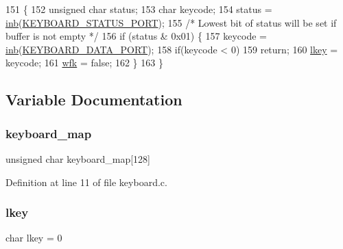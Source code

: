 \begin{DoxyCode}
151                                  \{
152     \textcolor{keywordtype}{unsigned} \textcolor{keywordtype}{char} status;
153     \textcolor{keywordtype}{char} keycode;
154     status = \hyperlink{a00164_a0223c8898dfec29069879dc51076e28a_a0223c8898dfec29069879dc51076e28a}{inb}(\hyperlink{a00041_ab79ca089665bc7f5cc151883d1bc69ed_ab79ca089665bc7f5cc151883d1bc69ed}{KEYBOARD\_STATUS\_PORT});
155     \textcolor{comment}{/* Lowest bit of status will be set if buffer is not empty */}
156     \textcolor{keywordflow}{if} (status & 0x01) \{
157         keycode = \hyperlink{a00164_a0223c8898dfec29069879dc51076e28a_a0223c8898dfec29069879dc51076e28a}{inb}(\hyperlink{a00041_a49e0a04e81098085d2948c1e9f8c99cb_a49e0a04e81098085d2948c1e9f8c99cb}{KEYBOARD\_DATA\_PORT});
158         \textcolor{keywordflow}{if}(keycode < 0)
159             \textcolor{keywordflow}{return};
160         \hyperlink{a00038_ade374650022cb30c4f5591a8dafad685_ade374650022cb30c4f5591a8dafad685}{lkey} = keycode;
161         \hyperlink{a00038_a6ddd5223379778858edc46ffbec19775_a6ddd5223379778858edc46ffbec19775}{wfk} = \textcolor{keyword}{false};
162     \}
163 \}
\end{DoxyCode}


\subsection{Variable Documentation}
\mbox{\label{a00038_a5d0b5e007d1b57bf84d1c03439810533_a5d0b5e007d1b57bf84d1c03439810533}} 
\subsubsection{\texorpdfstring{keyboard\+\_\+map}{keyboard\_map}}
{\footnotesize\ttfamily unsigned char keyboard\+\_\+map\mbox{[}128\mbox{]}}



Definition at line 11 of file keyboard.\+c.

\mbox{\label{a00038_ade374650022cb30c4f5591a8dafad685_ade374650022cb30c4f5591a8dafad685}} 
\subsubsection{\texorpdfstring{lkey}{lkey}}
{\footnotesize\ttfamily char lkey = 0}



